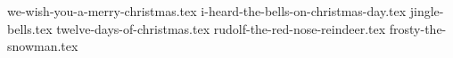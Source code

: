 \documentclass[letterpaper]{article}
\begin{document}
\begin{songs}{}

{we-wish-you-a-merry-christmas.tex}
{i-heard-the-bells-on-christmas-day.tex}
{jingle-bells.tex}
{twelve-days-of-christmas.tex}
{rudolf-the-red-nose-reindeer.tex}
{frosty-the-snowman.tex}

\begin{comment}
\end{comment}

\end{songs}
\end{document}
